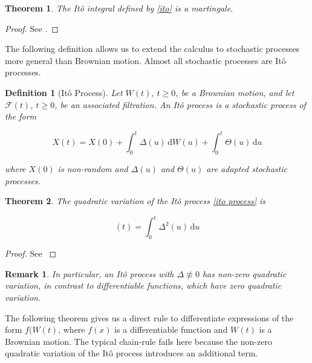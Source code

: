 \documentclass[11pt, a4paper]{article}
\newtheorem{theorem}{Theorem}
\newtheorem{definition}{Definition}
\newtheorem{remark}{Remark}
\numberwithin{equation}{subsection}
\numberwithin{definition}{subsection}
\numberwithin{theorem}{subsection}
\numberwithin{remark}{subsection}
\begin{document}

\begin{theorem}
    The It\^{o} integral defined by \eqref{ito} is a martingale.
\end{theorem}

\begin{proof}
    See \cite[p.~128]{shreve2004}.
\end{proof}

The following definition allows us to extend the calculus to stochastic processes more general than Brownian motion. Almost all stochastic processes are It\^{o} processes.

\begin{definition}[It\^{o} Process]
    Let \(W(t)\), \(t \geq 0\), be a Brownian motion, and let \(\mathcal{F}(t)\), \(t \geq 0\), be an associated filtration. An \textup{It\^{o} process} is a stochastic process of the form

    \begin{equation}
        X(t) = X(0) + \int_{0}^{t}\Delta(u) \, \mathrm{d}W(u) + \int_{0}^{t}\Theta(u) \, \mathrm{d}u
        \label{ito process}
    \end{equation}

    where \(X(0)\) is non-random and \(\Delta(u)\) and \(\Theta(u)\) are adapted stochastic processes.
    
\end{definition}

\begin{theorem}
    The quadratic variation of the It\^{o} process \eqref{ito process} is

    \begin{equation}
        [X, X](t) = \int_0^t \Delta^2(u) \, \mathrm{d}u
    \end{equation}
    
\end{theorem}

\begin{proof}
    See \cite[p.~143]{shreve2004}
\end{proof}

\begin{remark}
    In particular, an Itô process with \(\Delta \not\equiv 0\) has non-zero quadratic variation, in contrast to differentiable functions, which have zero quadratic variation.
\end{remark}

The following theorem gives us a direct rule to differentiate expressions of the form \(f(W(t)\), where \(f(x)\) is a differentiable function and \(W(t)\) is a Brownian motion. The typical chain-rule fails here because the non-zero quadratic variation of the It\^{o} process introduces an additional term.
\end{document}
